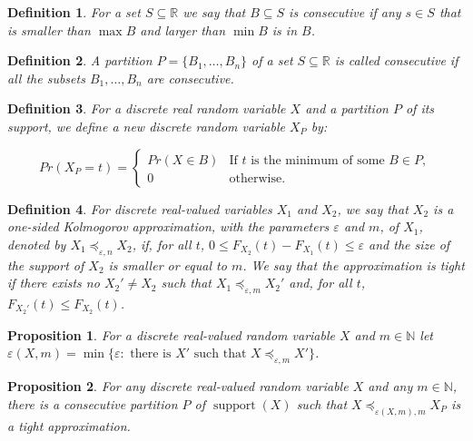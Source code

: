 \documentclass[review]{elsarticle}
\newtheorem{definition}{Definition}
\newtheorem{proposition}{Proposition}
\DeclareMathOperator{\supp}{support}
\begin{document}
\begin{definition}\label{consecutive} For a set $S \subseteq \mathbb{R}$ we say that
$B \subseteq S$ is \emph{consecutive} if any $s\in S$ that is smaller than $\max B$ and larger than $\min B$ is in $B$.
\end{definition}

\begin{definition}\label{part_consecutive} A partition $P=\{B_1,\dots,B_n\}$ of a set $S \subseteq \mathbb{R}$ is called 
\emph{consecutive} if all the subsets $B_1 ,\dots,B_n$ are consecutive.
\end{definition}


\begin{definition}\label{partition}
	For a discrete real random variable $X$ and a partition $P$ of its support, we define a new discrete random variable $X_P$ by:
	
	$$Pr(X_P = t) = \begin{cases} 
	Pr(X\in B) & \text{If $t$ is the minimum of some } B \in P, \\
	0      & \text{otherwise.}
	\end{cases}$$
\end{definition}


\begin{definition}
	For discrete real-valued variables $X_1$ and $X_2$, we say that $X_2$ is a one-sided Kolmogorov approximation, with the parameters $\varepsilon$ and $m$, of $X_1$, denoted by 
	$X_1 \preceq_{\varepsilon,n} X_2$, if, for all $t$, $0 \leq   F_{X_2}(t)-F_{X_1}(t) \leq \varepsilon$ and the size of the support of $X_2$ is smaller or equal to $m$. We say that the approximation is tight if there exists no  $X_2' \neq X_2$ such that $X_1 \preceq_{\varepsilon,m} X_2'$ and, for all $t$, $F_{X_2'}(t) \leq F_{X_2}(t)$. 
\end{definition}

\begin{proposition}
	For a discrete real-valued random variable $X$ and $m \in \mathbb{N}$ let $\varepsilon(X,m) = \min\{\varepsilon \colon \text{ there is $X'$ such that $X \preceq_{\varepsilon,m} X'$}\}$. 
\end{proposition}

\begin{proposition}
	For any discrete real-valued random variable $X$ and any $m \in \mathbb{N}$, there is a consecutive partition $P$ of $\supp(X)$ such that $X \preceq_{\varepsilon(X,m),m} X_P$ 
	is a tight approximation.
\end{proposition}
\end{document}
